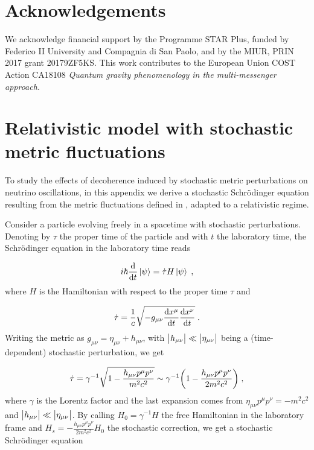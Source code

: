 \documentclass[11pt]{article}
\begin{document}
\section*{Acknowledgements}
We acknowledge financial support by the Programme STAR Plus, funded by Federico II University and Compagnia di San Paolo, and by the MIUR, PRIN 2017 grant 20179ZF5KS. This work contributes to the European Union COST Action CA18108 {\it Quantum gravity phenomenology in the multi-messenger approach.}

\newpage

\appendix



\section{Relativistic model with stochastic metric fluctuations}\label{appendix relativistic model}\renewcommand{\theequation}{\thesection.\arabic{equation}}\setcounter{equation}{0}

To study the effects of decoherence induced by stochastic metric perturbations on neutrino oscillations, in this appendix we derive a stochastic Schr\"{o}dinger equation resulting from the metric fluctuations defined in \cite{Breuer:2008rh}, adapted to a relativistic regime. 

Consider a particle evolving freely in a spacetime with stochastic perturbations. Denoting by $\tau$ the proper time of the particle and with $t$ the laboratory time, the Schr\"{o}dinger equation in the laboratory time reads \cite{Zych:2011hu}

\begin{equation}
    i\hbar \dv{}{t}\ket{\psi} = \dot{\tau}H\ket{\psi}\;,
\end{equation}
where $H$ is the Hamiltonian with respect to the proper time $\tau$ and

\begin{equation}
    \dot{\tau} = \frac{1}{c}\sqrt{-g_{\mu\nu}\dv{x^\mu}{t}\dv{x^\nu}{t}}\;.
\end{equation}
Writing the metric as $g_{\mu\nu} = \eta_{\mu\nu}+h_{\mu\nu}$, with $\abs{h_{\mu\nu}}\ll \abs{\eta_{\mu\nu}}$ being a (time-dependent) stochastic perturbation, we get

\begin{equation}
    \dot{\tau} = \gamma^{-1}\sqrt{1-\frac{h_{\mu\nu}p^\mu p^\nu}{m^2 c^2}} \sim \gamma^{-1}\qty(1-\frac{h_{\mu\nu}p^\mu p^\nu}{2m^2 c^2})\;,
\end{equation}
where $\gamma$ is the Lorentz factor and the last expansion comes from $\eta_{\mu\nu}p^\mu p^\nu = -m^2 c^2$ and $\abs{h_{\mu\nu}}\ll \abs{\eta_{\mu\nu}}$. By calling $H_0 = \gamma^{-1}H$ the free Hamiltonian in the laboratory frame and $H_s = -\frac{h_{\mu\nu}p^\mu p^\nu}{2m^2 c^2}H_0$ the stochastic correction, we get a stochastic Schr\"{o}dinger equation 
\end{document}
